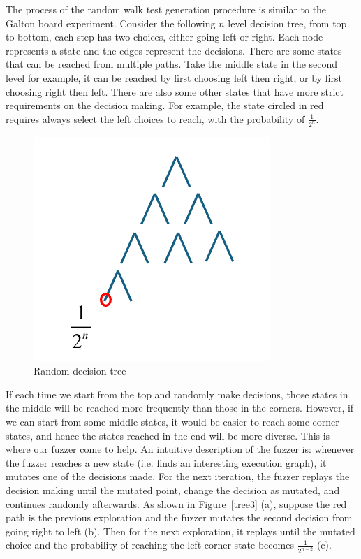 The process of the random walk test generation procedure is similar to the Galton board experiment. Consider the following $n$ level decision tree, from top to bottom, each step has two choices, either going left or right. Each node represents a state and the edges represent the decisions. There are some states that can be reached from multiple paths. Take the middle state in the second level for example, it can be reached by first choosing left then right, or by first choosing right then left. There are also some other states that have more strict requirements on the decision making. For example, the state circled in red requires always select the left choices to reach, with the probability of $\frac{1}{2^n}$. 
\begin{figure}[htbp]  
    \centering
    \includegraphics[scale=0.5]{figure/tree.pdf}   
    \caption{Random decision tree}  
    \label{tree}  
\end{figure}



If each time we start from the top and randomly make decisions, those states in the middle will be reached more frequently than those in the corners. However, if we can start from some middle states, it would be easier to reach some corner states, and hence the states reached in the end will be more diverse. This is where our fuzzer come to help. An intuitive description of the fuzzer is: whenever the fuzzer reaches a new state (i.e. finds an interesting execution graph), it mutates one of the decisions made. For the next iteration, the fuzzer replays the decision making until the mutated point, change the decision as mutated, and continues randomly afterwards. As shown in Figure~\ref{tree3} (a), suppose the red path is the previous exploration and the fuzzer mutates the second decision from going right to left (b). Then for the next exploration, it replays until the mutated choice and the probability of reaching the left corner state becomes $\frac{1}{2^{n-2}}$ (c). 

